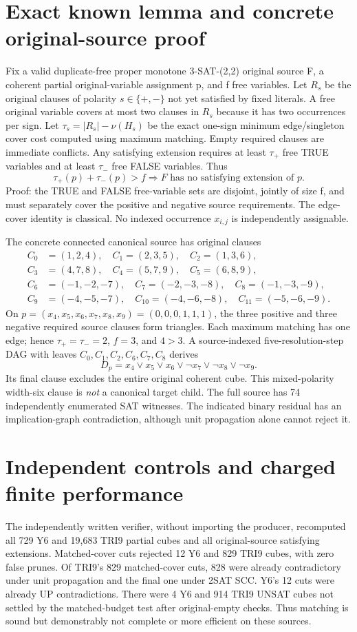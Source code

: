\documentclass[10pt]{article}
\begin{document}
\section*{Exact known lemma and concrete original-source proof}
Fix a valid duplicate-free proper monotone 3-SAT-(2,2) original source F,
a coherent partial original-variable assignment p, and f free variables.
Let $R_s$ be the original clauses of polarity $s\in\{+,-\}$ not yet
satisfied by fixed literals. A free original variable covers at most two
clauses in $R_s$ because it has two occurrences per sign. Let
$\tau_s=|R_s|-\nu(H_s)$ be the exact one-sign minimum edge/singleton cover
cost computed using maximum matching. Empty required clauses are immediate
conflicts. Any satisfying extension requires at least $\tau_+$ free
TRUE variables and at least $\tau_-$ free FALSE variables. Thus
\[
 \boxed{\tau_+(p)+\tau_-(p)>f\Longrightarrow
   F\text{ has no satisfying extension of }p.}
\]
Proof: the TRUE and FALSE free-variable sets are disjoint, jointly
of size f, and must separately cover the positive and negative source
requirements. The edge-cover identity is classical. No indexed occurrence
$x_{i,j}$ is independently assignable.

The concrete connected canonical source has original clauses
\[
\begin{split}
C_0&=(1,2,4),\quad C_1=(2,3,5),\quad C_2=(1,3,6),\\
C_3&=(4,7,8),\quad C_4=(5,7,9),\quad C_5=(6,8,9),\\
C_6&=(-1,-2,-7),\quad C_7=(-2,-3,-8),\quad C_8=(-1,-3,-9),\\
C_9&=(-4,-5,-7),\quad C_{10}=(-4,-6,-8),\quad C_{11}=(-5,-6,-9).
\end{split}
\]
On $p=(x_4,x_5,x_6,x_7,x_8,x_9)=(0,0,0,1,1,1)$,
the three positive and three negative required source clauses form
triangles. Each maximum matching has one edge; hence
$\tau_+=\tau_-=2$, $f=3$, and $4>3$.
A source-indexed five-resolution-step DAG with leaves
$C_0,C_1,C_2,C_6,C_7,C_8$ derives
\[
 \boxed{D_p=x_4\vee x_5\vee x_6\vee
          \neg x_7\vee\neg x_8\vee\neg x_9.}
\]
Its final clause excludes the entire original coherent cube. This
mixed-polarity width-six clause is \emph{not} a canonical target child.
The full source has 74 independently enumerated SAT witnesses.
The indicated binary residual has an implication-graph contradiction,
although unit propagation alone cannot reject it.

\section*{Independent controls and charged finite performance}
The independently written verifier, without importing the producer,
recomputed all 729 Y6 and 19,683 TRI9 partial cubes and all
original-source satisfying extensions. Matched-cover cuts rejected
12 Y6 and 829 TRI9 cubes, with zero false prunes. Of TRI9's
829 matched-cover cuts, 828 were already contradictory under unit
propagation and the final one under 2SAT SCC. Y6's 12 cuts were
already UP contradictions. There were 4 Y6 and 914 TRI9 UNSAT cubes
not settled by the matched-budget test after original-empty checks.
Thus matching is sound but demonstrably not complete or more
efficient on these sources.
\end{document}
